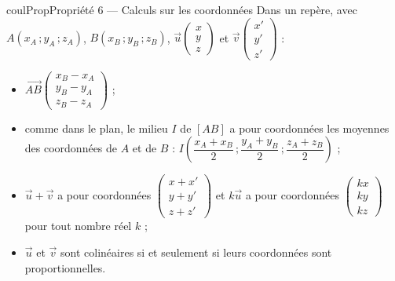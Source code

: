 \documentclass[11pt,a4paper]{article}
\makeatletter
\newcommand{\vect}[1]{\overrightarrow{#1}}
\newcounter{lycee@signet}
\newcommand{\signet}[3][]{\stepcounter{lycee@signet}%
  \edef\lycee@dest{\if\relax\detokenize{#1}\relax
    signet.\arabic{lycee@signet}\else#1\fi}%
  \hypertarget{\lycee@dest}{}\bookmark[level=#2,dest=\lycee@dest]{#3}}
\newenvironment{proprietebox}[1][Propriété]%
  {\begin{boitecours}[phantom={\signet{2}{#1}}]{coulProp}{#1}}{\end{boitecours}}
\makeatother
\begin{document}
\begin{proprietebox}[Propriété 6 --- Calculs sur les coordonnées]
Dans un repère, avec $A(x_{A}\,;y_{A}\,;z_{A})$, $B(x_{B}\,;y_{B}\,;z_{B})$,
$\vect{u}\begin{pmatrix}x\\y\\z\end{pmatrix}$ et $\vect{v}\begin{pmatrix}x'\\y'\\z'\end{pmatrix}$ :
\begin{itemize}
  \item $\vect{AB}\begin{pmatrix}x_{B}-x_{A}\\y_{B}-y_{A}\\z_{B}-z_{A}\end{pmatrix}$ ;
  \item comme dans le plan, le milieu $I$ de $[AB]$ a pour coordonnées les moyennes
        des coordonnées de $A$ et de $B$ :
        $I\left(\dfrac{x_{A}+x_{B}}{2}\,;\dfrac{y_{A}+y_{B}}{2}\,;\dfrac{z_{A}+z_{B}}{2}\right)$ ;
  \item $\vect{u}+\vect{v}$ a pour coordonnées $\begin{pmatrix}x+x'\\y+y'\\z+z'\end{pmatrix}$
        et $k\vect{u}$ a pour coordonnées $\begin{pmatrix}kx\\ky\\kz\end{pmatrix}$ pour tout
        nombre réel $k$ ;
  \item $\vect{u}$ et $\vect{v}$ sont colinéaires si et seulement si leurs coordonnées
        sont proportionnelles.
\end{itemize}
\end{proprietebox}
\end{document}
